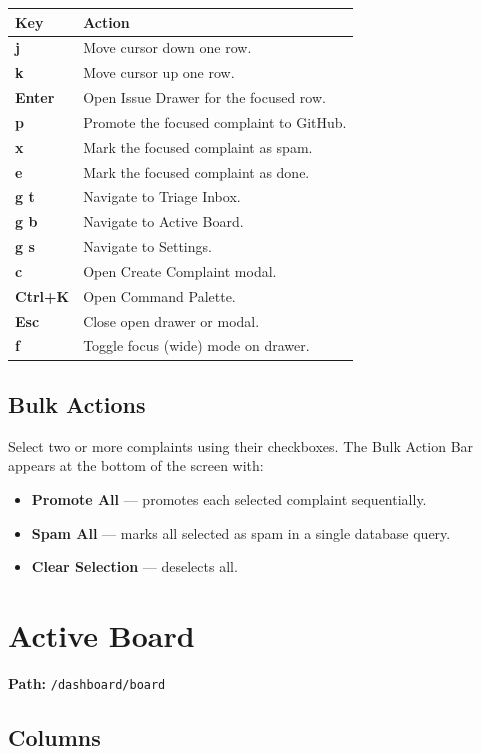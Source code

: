 \documentclass[12pt,a4paper]{report}
\begin{document}
\begin{longtable}{>{\ttfamily\bfseries}p{2cm} p{10cm}}
\toprule
Key & Action \\
\midrule
\endhead
j & Move cursor down one row. \\
k & Move cursor up one row. \\
Enter & Open Issue Drawer for the focused row. \\
p & Promote the focused complaint to GitHub. \\
x & Mark the focused complaint as spam. \\
e & Mark the focused complaint as done. \\
g t & Navigate to Triage Inbox. \\
g b & Navigate to Active Board. \\
g s & Navigate to Settings. \\
c & Open Create Complaint modal. \\
Ctrl+K & Open Command Palette. \\
Esc & Close open drawer or modal. \\
f & Toggle focus (wide) mode on drawer. \\
\bottomrule
\end{longtable}

\subsection{Bulk Actions}

Select two or more complaints using their checkboxes.  The Bulk Action Bar
appears at the bottom of the screen with:
\begin{itemize}
  \item \textbf{Promote All} --- promotes each selected complaint sequentially.
  \item \textbf{Spam All} --- marks all selected as spam in a single database
    query.
  \item \textbf{Clear Selection} --- deselects all.
\end{itemize}

\section{Active Board}

\textbf{Path:} \texttt{/dashboard/board}

\subsection{Columns}
\end{document}
